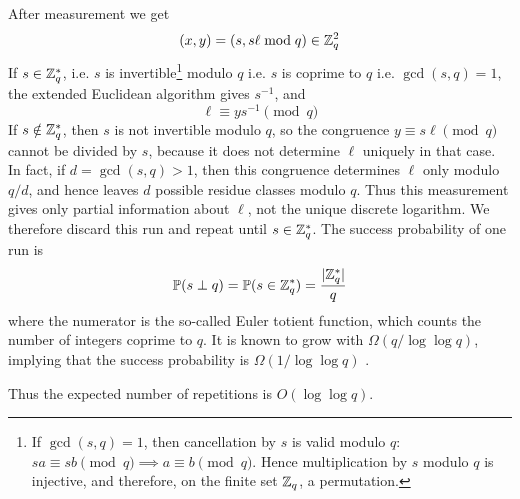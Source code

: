 After measurement we get
\[
(x,y)
=
(s,s\ell\bmod q)
\in
\mathbb{Z}_q^2
\]
If $s \in \mathbb{Z}_q^*$, i.e. \(s\) is invertible\footnote{%
If \(\gcd(s,q)=1\), then cancellation by \(s\) is valid modulo \(q\):
\(
sa\equiv sb\pmod q
\implies
a\equiv b\pmod q
\).
Hence multiplication by \(s\) modulo \(q\) is injective, and therefore, on the finite set \(\mathbb{Z}_q\), a permutation.%
} modulo \(q\) i.e. $s$ is coprime to $q$ i.e. $\gcd(s,q)=1$, the extended Eu\-cli\-dean algorithm gives \(s^{-1}\), and
\[
\ell
\equiv
ys^{-1}
\pmod q
\]
If \(s\notin\mathbb{Z}_q^*\), 
then \(s\) is not invertible modulo \(q\), 
so the congruence
\(
y\equiv s\ell \pmod q
\)
cannot be divided by \(s\), because it does not determine $\ell$ uniquely in that case. 
In fact, if \(d=\gcd(s,q)>1\), 
then this congruence determines \(\ell\) only modulo \(q/d\), 
and hence leaves \(d\) possible residue classes modulo \(q\). 
Thus this measurement gives only partial information about \(\ell\), 
not the unique discrete logarithm.
We therefore discard this run and repeat until \(s\in\mathbb{Z}_q^*\).
The success probability of one run is
\[
\operatorname{\mathbb{P}}(s \perp q)
=
\operatorname{\mathbb{P}}(s\in\mathbb{Z}_q^*)
=
\frac{|\mathbb{Z}_q^*|}{q}
\]
where the numerator is the so-called  Euler totient function, which counts the number of integers coprime to \(q\).
It is known to grow with $\Omega(q/\log\log q)$, implying that the success probability is $\Omega(1/\log\log q)$ \cite{wikipediaTotientGrowth}.

Thus the expected number of repetitions is \(O(\log\log q)\).

